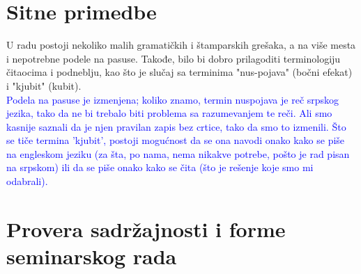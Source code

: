 \documentclass[a4paper]{report}
\newcommand{\odgovor}[1]{\textcolor{blue}{#1}}
\begin{document}
\section{Sitne primedbe}
U radu postoji nekoliko malih gramatičkih  i štamparskih grešaka, a na više mesta i nepotrebne podele na pasuse. Takođe, bilo bi dobro prilagoditi terminologiju čitaocima i podneblju, kao što je slučaj sa terminima "nus-pojava" (bočni efekat) i "kjubit" (kubit).\\
\odgovor {Podela na pasuse je izmenjena; koliko znamo, termin nuspojava je reč srpskog jezika, tako da ne bi trebalo biti problema sa razumevanjem te reči. Ali smo kasnije saznali da je njen pravilan zapis bez crtice, tako da smo to izmenili. Što se tiče termina 'kjubit', postoji mogućnost da se ona navodi onako kako se piše na engleskom jeziku (za šta, po nama, nema nikakve potrebe, pošto je rad pisan na srpskom) ili da se piše onako kako se čita (što je rešenje koje smo mi odabrali).}



\section{Provera sadržajnosti i forme seminarskog rada}
\end{document}
